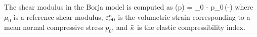   The shear modulus in the Borja model is computed as
  \Beq
    \mu(p) = \mu_0 - \alpha p_0\,\exp\left(-\right) 
  \Eeq
  where $\mu_0$ is a reference shear modulus, $\varepsilon^e_{v0}$ is the volumetric strain corresponding 
  to a mean normal compressive stress $p_0$, and $\tilde{\kappa}$ is the elastic compressibility index.
  

